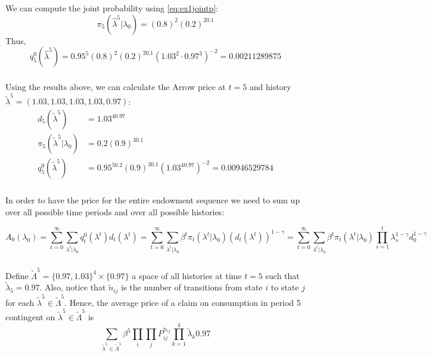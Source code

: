 \documentclass[]{article}
\begin{document}
We can compute the joint probability using \eqref{eq:ex1jointp}:
\begin{equation}
	\pi_5(\hat{\lambda}^5|\lambda_0) = (0.8)^2(0.2)^20.1 \nonumber
\end{equation}
Thus,
\begin{equation}
	q_5^0(\hat{\lambda}^5) = 0.95^5(0.8)^2(0.2)^20.1(1.03^2\cdot 0.97^3)^{-2} = 0.00211289875 \nonumber
\end{equation}

\subsubsection{}

Using the results above, we can calculate the Arrow price at $t = 5$ and history $\tilde{\lambda}^5 = (1.03, 1.03, 1.03, 1.03, 0.97)$:
\begin{equation}
	\begin{split}
		d_5(\tilde{\lambda}^5)& = 1.03^40.97 \\ \nonumber
		\pi_5(\tilde{\lambda}^5|\lambda_0)& = 0.2(0.9)^30.1 \\
		q_5^0(\tilde{\lambda}^5)& = 0.95^50.2(0.9)^30.1(1.03^40.97)^{-2} = 0.00946529784
	\end{split}
\end{equation}

\subsubsection{}

In order to have the price for the entire endowment sequence we need to sum up over all possible time periods and over all possible histories:

\begin{equation}
	A_0(\lambda_0) = \sum\limits_{t = 0}^\infty\sum\limits_{\lambda^t|\lambda_0}q_t^0(\lambda^t)d_t(\lambda^t) = \sum\limits_{t = 0}^\infty\sum\limits_{\lambda^t|\lambda_0}\beta^t\pi_t(\lambda^t|\lambda_0)(d_t(\lambda^t))^{1-\gamma} = \sum\limits_{t = 0}^\infty\sum\limits_{\lambda^t|\lambda_0}\beta^t\pi_t(\lambda^t|\lambda_0)\prod\limits_{s = 1}^t\lambda_s^{1-\gamma}d_0^{1-\gamma}\nonumber
\end{equation}

\subsubsection{}

Define $\tilde{\Lambda}^5 = \{0.97, 1.03\}^4\times\{0.97\}$ a space of all histories at time $t = 5$ such that $\tilde{\lambda}_5 = 0.97$. Also, notice that $\tilde{n}_{ij}$ is the number of transitions from state $i$ to state $j$ for each $\tilde{\lambda}^5\in\tilde{\Lambda}^5$. Hence, the average price of a claim on consumption in period 5 contingent on $\tilde{\lambda}^5\in\tilde{\Lambda}^5$ is
\begin{equation}
	\sum\limits_{\tilde{\lambda}^5\in\tilde{\Lambda}^5}\beta^5\prod\limits_{i}\prod\limits_{j}P_{ij}^{\tilde{n}_{ij}}\prod\limits_{k = 1}^4\tilde{\lambda}_k0.97 \nonumber
\end{equation}
\end{document}
